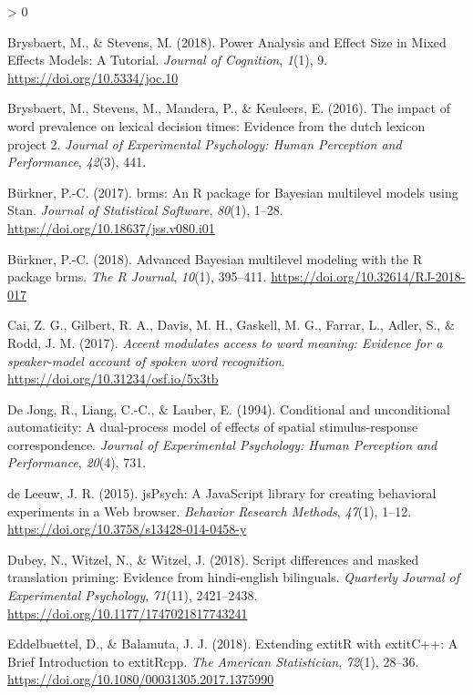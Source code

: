 \documentclass[
  english,
  man,floatsintext]{apa6}
\newlength{\cslhangindent}
\newenvironment{CSLReferences}[2] %
 {%
  \setlength{\parindent}{0pt}
  \ifodd #1 \everypar{\setlength{\hangindent}{\cslhangindent}}\ignorespaces\fi
  \ifnum #2 > 0
  \setlength{\parskip}{#2\baselineskip}
  \fi
 }%
 {}
\begin{document}
\begin{CSLReferences}{1}{0}
\leavevmode\hypertarget{ref-brysbaert2018}{}%
Brysbaert, M., \& Stevens, M. (2018). Power Analysis and Effect Size in Mixed Effects Models: A Tutorial. \emph{Journal of Cognition}, \emph{1}(1), 9. \url{https://doi.org/10.5334/joc.10}

\leavevmode\hypertarget{ref-brysbaert2016impact}{}%
Brysbaert, M., Stevens, M., Mandera, P., \& Keuleers, E. (2016). The impact of word prevalence on lexical decision times: Evidence from the dutch lexicon project 2. \emph{Journal of Experimental Psychology: Human Perception and Performance}, \emph{42}(3), 441.

\leavevmode\hypertarget{ref-R-brms_a}{}%
Bürkner, P.-C. (2017). {brms}: An {R} package for {Bayesian} multilevel models using {Stan}. \emph{Journal of Statistical Software}, \emph{80}(1), 1--28. \url{https://doi.org/10.18637/jss.v080.i01}

\leavevmode\hypertarget{ref-R-brms_b}{}%
Bürkner, P.-C. (2018). Advanced {Bayesian} multilevel modeling with the {R} package {brms}. \emph{The R Journal}, \emph{10}(1), 395--411. \url{https://doi.org/10.32614/RJ-2018-017}

\leavevmode\hypertarget{ref-cai2017accent}{}%
Cai, Z. G., Gilbert, R. A., Davis, M. H., Gaskell, M. G., Farrar, L., Adler, S., \& Rodd, J. M. (2017). \emph{Accent modulates access to word meaning: Evidence for a speaker-model account of spoken word recognition}. \url{https://doi.org/10.31234/osf.io/5x3tb}

\leavevmode\hypertarget{ref-de1994conditional}{}%
De Jong, R., Liang, C.-C., \& Lauber, E. (1994). Conditional and unconditional automaticity: A dual-process model of effects of spatial stimulus-response correspondence. \emph{Journal of Experimental Psychology: Human Perception and Performance}, \emph{20}(4), 731.

\leavevmode\hypertarget{ref-deleeuw2015}{}%
de Leeuw, J. R. (2015). jsPsych: A JavaScript library for creating behavioral experiments in a Web browser. \emph{Behavior Research Methods}, \emph{47}(1), 1--12. \url{https://doi.org/10.3758/s13428-014-0458-y}

\leavevmode\hypertarget{ref-Dubey_2018}{}%
Dubey, N., Witzel, N., \& Witzel, J. (2018). Script differences and masked translation priming: Evidence from hindi-english bilinguals. \emph{Quarterly Journal of Experimental Psychology}, \emph{71}(11), 2421--2438. \url{https://doi.org/10.1177/1747021817743241}

\leavevmode\hypertarget{ref-R-Rcpp_b}{}%
Eddelbuettel, D., \& Balamuta, J. J. (2018). {Extending extit{R} with extit{C++}: A Brief Introduction to extit{Rcpp}}. \emph{The American Statistician}, \emph{72}(1), 28--36. \url{https://doi.org/10.1080/00031305.2017.1375990}


\end{CSLReferences}
\end{document}
